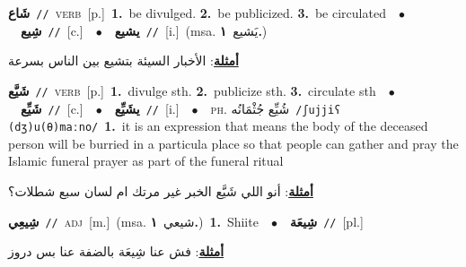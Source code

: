 \documentclass[10pt,a4paper,twoside]{article} %
\begin{document}
\begin{multicols}{2}
{\setlength\topsep{0pt}\textbf{\foreignlanguage{arabic}{شَاع}}\ {\color{gray}\texttt{//}\color{black}}\ \textsc{verb}\ [p.]\ \textbf{1.}~be divulged.  \textbf{2.}~be publicized.  \textbf{3.}~be circulated\ \ $\bullet$\ \ \setlength\topsep{0pt}\textbf{\foreignlanguage{arabic}{شِيع}}\ {\color{gray}\texttt{//}\color{black}}\ [c.]\ \ $\bullet$\ \ \setlength\topsep{0pt}\textbf{\foreignlanguage{arabic}{يشيع}}\ {\color{gray}\texttt{//}\color{black}}\ [i.]\ \color{gray}(msa. \foreignlanguage{arabic}{يَشيع}~\foreignlanguage{arabic}{\textbf{١.}})\color{black}\  \begin{flushright}\color{gray}\foreignlanguage{arabic}{\textbf{\underline{\foreignlanguage{arabic}{أمثلة}}}: الأخبار السيئة بتشيع بين الناس بسرعة}\end{flushright}\color{black}} \vspace{2mm}

{\setlength\topsep{0pt}\textbf{\foreignlanguage{arabic}{شَيَّع}}\ {\color{gray}\texttt{//}\color{black}}\ \textsc{verb}\ [p.]\ \textbf{1.}~divulge sth.  \textbf{2.}~publicize sth.  \textbf{3.}~circulate sth\ \ $\bullet$\ \ \setlength\topsep{0pt}\textbf{\foreignlanguage{arabic}{شَيِّع}}\ {\color{gray}\texttt{//}\color{black}}\ [c.]\ \ $\bullet$\ \ \setlength\topsep{0pt}\textbf{\foreignlanguage{arabic}{يشَيِّع}}\ {\color{gray}\texttt{//}\color{black}}\ [i.]\ \ $\bullet$\ \ \textsc{ph.} \color{gray} \foreignlanguage{arabic}{شُيِّع جُثْمَانُه}\color{black}\ {\color{gray}\texttt{/{\sffamily ʃujjiʕ (dʒ)u(θ)maːno}/}\color{black}}\ \textbf{1.}~it is an expression that means the body of the deceased person will be burried in a particula place so that people can gather and pray the Islamic funeral prayer as part of the funeral ritual\  \begin{flushright}\color{gray}\foreignlanguage{arabic}{\textbf{\underline{\foreignlanguage{arabic}{أمثلة}}}: أنو اللي شَيَّع الخبر غير مرتك ام لسان سبع شطلات؟}\end{flushright}\color{black}} \vspace{2mm}

{\setlength\topsep{0pt}\textbf{\foreignlanguage{arabic}{شِيعِي}}\ {\color{gray}\texttt{//}\color{black}}\ \textsc{adj}\ [m.]\ \color{gray}(msa. \foreignlanguage{arabic}{شيعي}~\foreignlanguage{arabic}{\textbf{١.}})\color{black}\ \textbf{1.}~Shiite\ \ $\bullet$\ \ \setlength\topsep{0pt}\textbf{\foreignlanguage{arabic}{شِيعَة}}\ {\color{gray}\texttt{//}\color{black}}\ [pl.]\  \begin{flushright}\color{gray}\foreignlanguage{arabic}{\textbf{\underline{\foreignlanguage{arabic}{أمثلة}}}: فش عنا شِيعَة بالضفة عنا بس دروز}\end{flushright}\color{black}} \vspace{2mm}


\end{multicols}
\end{document}
